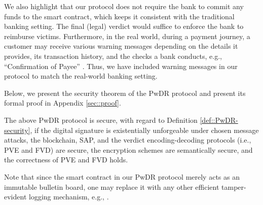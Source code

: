 We also highlight that our protocol does not require the bank to commit any funds to the smart contract, which keeps it consistent with the traditional banking setting. The final (legal) verdict would suffice to enforce the bank to reimburse victims. Furthermore, in the real world, during a payment journey, a customer may receive various warning messages depending on the details it provides, its transaction history, and the checks a bank conducts, e.g., ``Confirmation of Payee'' \cite{CoP}. Thus, we have included warning messages in our protocol to match the real-world banking setting. 

Below, we present the security theorem of the PwDR protocol and present its formal proof in Appendix \ref{sec::proof}. 

\begin{theorem}\label{theorem::PwDR-security}
The above PwDR protocol is secure, with regard to Definition \ref{def::PwDR-security}, if the digital signature is existentially unforgeable under chosen message attacks,  the blockchain, SAP, and the verdict encoding-decoding protocols (i.e., PVE and FVD) are secure,  the encryption schemes are semantically secure, and the correctness of PVE and FVD holds. 
\end{theorem}



Note that since the smart contract in our PwDR protocol merely acts as an immutable bulletin board, one may replace it with any other efficient tamper-evident logging mechanism, e.g., \cite{CrosbyW09,Soriano-Salvador21,rfc/rfc6962}. 






%




